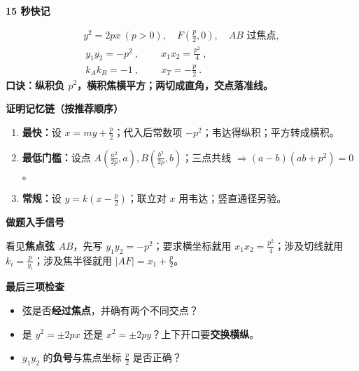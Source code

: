 \begin{summarybox}
\textbf{\textcolor{CSummary}{15 秒快记}}\par\smallskip
\[
 \begin{gathered}
 y^2=2px\ (p>0),\quad F\!\left(\frac p2,0\right),\quad AB\text{ 过焦点},\\[3pt]
 \boxed{\ y_1y_2=-p^2\ },\qquad
 \boxed{\ x_1x_2=\frac{p^2}{4}\ },\\[3pt]
 \boxed{\ k_Ak_B=-1\ },\qquad
 \boxed{\ x_T=-\frac p2\ }.
 \end{gathered}
\]
\textbf{口诀：}\quad \textbf{纵积负 $p^2$，横积焦横平方；两切成直角，交点落准线。}

\medskip
\textbf{\textcolor{CSummary}{证明记忆链（按推荐顺序）}}\par\smallskip
\begin{enumerate}[leftmargin=*,itemsep=0.3em]
 \item \textbf{最快：}设 $x=my+\frac p2$；代入后常数项 $-p^2$；韦达得纵积；平方转成横积。
 \item \textbf{最低门槛：}设点 $A(\frac{a^2}{2p},a),B(\frac{b^2}{2p},b)$；三点共线 $\Rightarrow(a-b)(ab+p^2)=0$。
 \item \textbf{常规：}设 $y=k(x-\frac p2)$；联立对 $x$ 用韦达；竖直通径另验。
\end{enumerate}

\medskip
\textbf{\textcolor{CSummary}{做题入手信号}}\par\smallskip
看见\textbf{焦点弦 $AB$}，先写 $y_1y_2=-p^2$；要求横坐标就用
$x_1x_2=\frac{p^2}{4}$；涉及切线就用 $k_i=\frac p{y_i}$；涉及焦半径就用
$|AF|=x_1+\frac p2$。

\medskip
\textbf{\textcolor{CSummary}{最后三项检查}}\par\smallskip
\begin{itemize}[leftmargin=*,itemsep=0.25em]
 \item 弦是否\textbf{经过焦点}，并确有两个不同交点？
 \item 是 $y^2=\pm2px$ 还是 $x^2=\pm2py$？上下开口要\textbf{交换横纵}。
 \item $y_1y_2$ 的\textbf{负号}与焦点坐标 $\frac p2$ 是否正确？
\end{itemize}
\end{summarybox}
